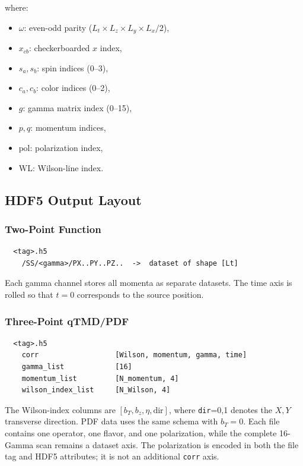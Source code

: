 \documentclass[11pt,a4paper]{article}
\begin{document}
where:
\begin{itemize}
  \item $\omega$: even-odd parity ($L_t \times L_z \times L_y \times L_x/2$),
  \item $x_{cb}$: checkerboarded $x$ index,
  \item $s_a, s_b$: spin indices (0--3),
  \item $c_a, c_b$: color indices (0--2),
  \item $g$: gamma matrix index (0--15),
  \item $p, q$: momentum indices,
  \item $\text{pol}$: polarization index,
  \item $\text{WL}$: Wilson-line index.
\end{itemize}

\subsection{HDF5 Output Layout}

\subsubsection{Two-Point Function}

\begin{verbatim}
  <tag>.h5
    /SS/<gamma>/PX..PY..PZ..  ->  dataset of shape [Lt]
\end{verbatim}

Each gamma channel stores all momenta as separate datasets. The time axis is rolled
so that $t=0$ corresponds to the source position.

\subsubsection{Three-Point qTMD/PDF}

\begin{verbatim}
  <tag>.h5
    corr                  [Wilson, momentum, gamma, time]
    gamma_list            [16]
    momentum_list         [N_momentum, 4]
    wilson_index_list     [N_Wilson, 4]
\end{verbatim}

The Wilson-index columns are $[b_T,b_z,\eta,\text{dir}]$, where
\texttt{dir}=0,1 denotes the \(X,Y\) transverse direction.  PDF data uses the
same schema with \(b_T=0\).  Each file contains one operator, one flavor, and
one polarization, while the complete 16-Gamma scan remains a dataset axis.
The polarization is encoded in both the file tag and HDF5 attributes; it is not
an additional \texttt{corr} axis.
\end{document}
